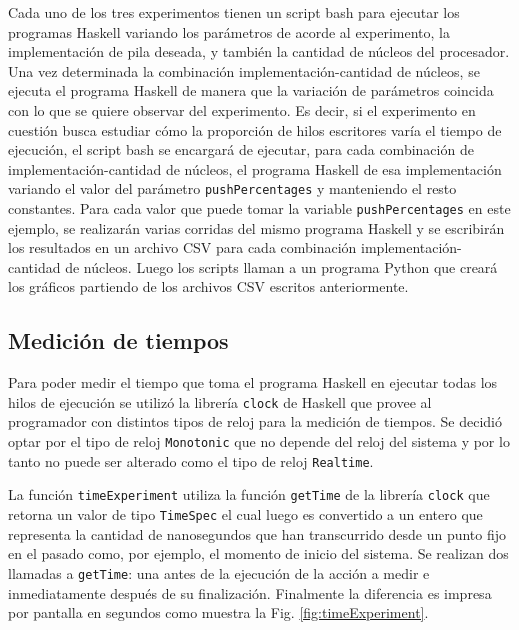 
Cada uno de los tres experimentos tienen un script bash para ejecutar los programas Haskell variando los parámetros de acorde al experimento, la implementación de pila deseada, y también la cantidad de núcleos del procesador.
Una vez determinada la combinación implementación-cantidad de núcleos, se ejecuta el programa Haskell de manera que la variación de parámetros coincida con lo que se quiere observar del experimento.
Es decir, si el experimento en cuestión busca estudiar cómo la proporción de hilos escritores varía el tiempo de ejecución, el script bash se encargará de ejecutar, para cada combinación de implementación-cantidad de núcleos, el programa Haskell de esa implementación variando el valor del parámetro \texttt{pushPercentages} y manteniendo el resto constantes.
Para cada valor que puede tomar la variable \texttt{pushPercentages} en este ejemplo, se realizarán varias corridas del mismo programa Haskell y se escribirán los resultados en un archivo CSV para cada combinación implementación-cantidad de núcleos.
Luego los scripts llaman a un programa Python que creará los gráficos partiendo de los archivos CSV escritos anteriormente.

\subsection{Medición de tiempos}\label{time-measuring}
Para poder medir el tiempo que toma el programa Haskell en ejecutar todas los hilos de ejecución se utilizó la librería \texttt{clock} \cite{timeMeasuring} de Haskell que provee al programador con distintos tipos de reloj para la medición de tiempos. Se decidió optar por el tipo de reloj \texttt{Monotonic} que no depende del reloj del sistema y por lo tanto no puede ser alterado como el tipo de reloj \texttt{Realtime}.

La función \texttt{timeExperiment} utiliza la función \texttt{getTime} de la librería \texttt{clock} que retorna un valor de tipo \texttt{TimeSpec} el cual luego es convertido a un entero que representa la cantidad de nanosegundos que han transcurrido desde un punto fijo en el pasado como, por ejemplo, el momento de inicio del sistema.
Se realizan dos llamadas a \texttt{getTime}: una antes de la ejecución de la acción a medir e inmediatamente después de su finalización. Finalmente la diferencia es impresa por pantalla en segundos como muestra la Fig. \ref{fig:timeExperiment}.

